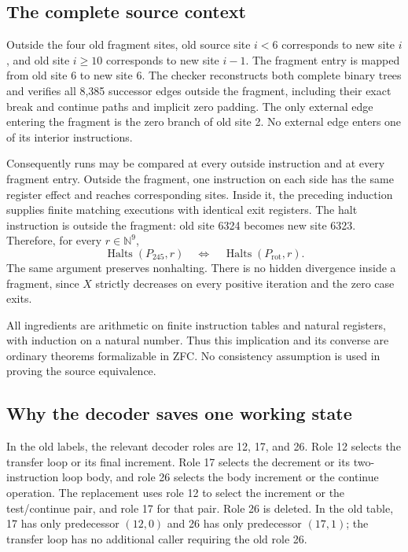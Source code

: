 \subsection{The complete source context}

Outside the four old fragment sites, old source site $i<6$ corresponds to
new site $i$, and old site $i\geq10$ corresponds to new site $i-1$.
The fragment entry is mapped from old site 6 to new site 6.  The checker
reconstructs both complete binary trees and verifies all 8,385 successor
edges outside the fragment, including their exact break and continue
paths and implicit zero padding.  The only external edge entering the
fragment is the zero branch of old site 2.  No external edge enters one
of its interior instructions.

Consequently runs may be compared at every outside instruction and at
every fragment entry.  Outside the fragment, one instruction on each
side has the same register effect and reaches corresponding sites.
Inside it, the preceding induction supplies finite matching executions
with identical exit registers.  The halt instruction is outside the
fragment: old site 6324 becomes new site 6323.  Therefore, for every
$r\in\mathbb N^9$,
\[
 \operatorname{Halts}(P_{245},r)
 \quad\Longleftrightarrow\quad
 \operatorname{Halts}(P_{\mathrm{rot}},r).
\]
The same argument preserves nonhalting.  There is no hidden divergence
inside a fragment, since $X$ strictly decreases on every positive
iteration and the zero case exits.

All ingredients are arithmetic on finite instruction tables and natural
registers, with induction on a natural number.  Thus this implication
and its converse are ordinary theorems formalizable in ZFC.  No
consistency assumption is used in proving the source equivalence.

\subsection{Why the decoder saves one working state}

In the old labels, the relevant decoder roles are 12, 17, and 26.
Role 12 selects the transfer loop or its final increment.  Role 17
selects the decrement or its two-instruction loop body, and role 26
selects the body increment or the continue operation.
The replacement uses role 12 to select the increment or the test/continue
pair, and role 17 for that pair.  Role 26 is deleted.  In the old table,
17 has only predecessor $(12,0)$ and 26 has only predecessor $(17,1)$;
the transfer loop has no additional caller requiring the old role 26.

